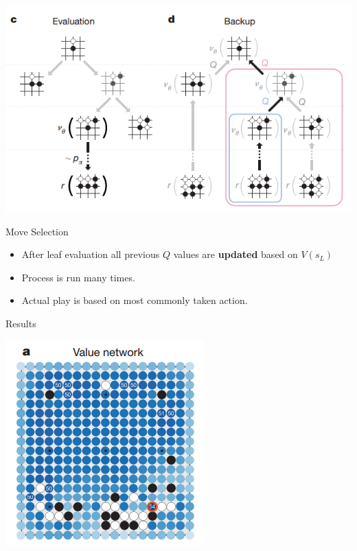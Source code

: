 \documentclass{beamer}
\begin{document}
\begin{frame}
  \begin{center}
    \includegraphics[width=\textwidth]{alphago/montecarlo2}
  \end{center}
\end{frame}

\begin{frame}{Move Selection}

  \begin{itemize}
  \item   After leaf evaluation all previous $Q$ values are 
    \textbf{updated} based on $V(s_L)$
    \air
  \item Process is run many times.
  \air
  \item Actual play is based on most commonly taken action. 
  \end{itemize}


\end{frame}


\begin{frame}{Results}
  \begin{center}
    \includegraphics[height=\textheight]{alphago/vnet}
  \end{center}
\end{frame}
\end{document}
